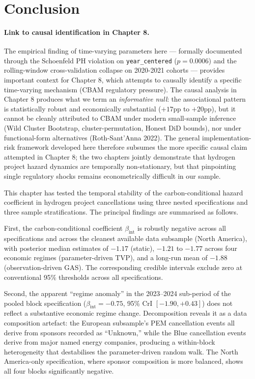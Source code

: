 \documentclass[11pt,a4paper]{article}
\newcommand{\bint}{\beta_{\mathrm{int}}}
\begin{document}
\section{Conclusion}
\paragraph{Link to causal identification in Chapter 8.} The empirical finding of time-varying parameters here — formally documented through the Schoenfeld PH violation on \texttt{year\_centered} ($p = 0.0006$) and the rolling-window cross-validation collapse on 2020-2021 cohorts — provides important context for Chapter 8, which attempts to causally identify a specific time-varying mechanism (CBAM regulatory pressure). The causal analysis in Chapter 8 produces what we term an \textit{informative null}: the associational pattern is statistically robust and economically substantial ($+17$pp to $+20$pp), but it cannot be cleanly attributed to CBAM under modern small-sample inference (Wild Cluster Bootstrap, cluster-permutation, Honest DiD bounds), nor under functional-form alternatives (Roth-Sant'Anna 2022). The general implementation-risk framework developed here therefore subsumes the more specific causal claim attempted in Chapter 8; the two chapters jointly demonstrate that hydrogen project hazard dynamics are temporally non-stationary, but that pinpointing single regulatory shocks remains econometrically difficult in our sample.


\label{sec:ch7-conclusion}

This chapter has tested the temporal stability of the carbon-conditional hazard coefficient in hydrogen project cancellations using three nested specifications and three sample stratifications. The principal findings are summarised as follows.

First, the carbon-conditional coefficient $\bint$ is robustly negative across all specifications and across the cleanest available data subsample (North America), with posterior median estimates of $-1.17$ (static), $-1.21$ to $-1.77$ across four economic regimes (parameter-driven TVP), and a long-run mean of $-1.88$ (observation-driven GAS). The corresponding credible intervals exclude zero at conventional 95\% thresholds across all specifications.

Second, the apparent ``regime anomaly'' in the 2023--2024 sub-period of the pooled block specification ($\bint = -0.75$, 95\% CrI $[-1.90, +0.43]$) does not reflect a substantive economic regime change. Decomposition reveals it as a data composition artefact: the European subsample's PEM cancellation events all derive from sponsors recorded as ``Unknown,'' while the Blue cancellation events derive from major named energy companies, producing a within-block heterogeneity that destabilises the parameter-driven random walk. The North America-only specification, where sponsor composition is more balanced, shows all four blocks significantly negative.
\end{document}
